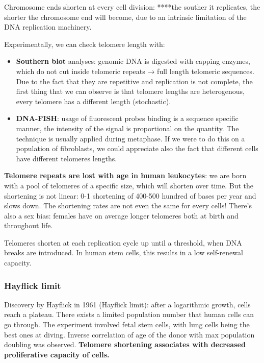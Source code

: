Chromosome ends shorten at every cell division: ****the souther it
replicates, the shorter the chromosome end will become, due to an
intrinsic limitation of the DNA replication machinery.

Experimentally, we can check telomere length with:

\begin{itemize}
\tightlist
\item
  \textbf{Southern blot} analyses: genomic DNA is digested with capping
  enzymes, which do not cut inside telomeric repeats → full length
  telomeric sequences. Due to the fact that they are repetitive and
  replication is not complete, the first thing that we can observe is
  that telomere lengths are heterogenous, every telomere has a different
  length (stochastic).
\item
  \textbf{DNA-FISH}: usage of fluorescent probes binding is a sequence
  specific manner, the intensity of the signal is proportional on the
  quantity. The technique is usually applied during metaphase. If we
  were to do this on a population of fibroblasts, we could appreciate
  also the fact that different cells have different telomeres lengths.
\end{itemize}

\textbf{Telomere repeats are lost with age in human leukocytes}: we are
born with a pool of telomeres of a specific size, which will shorten
over time. But the shortening is not linear: 0-1 shortening of 400-500
hundred of bases per year and slows down. The shortening rates are not
even the same for every cells! There's also a sex bias: females have on
average longer telomeres both at birth and throughout life.

Telomeres shorten at each replication cycle up until a threshold, when
DNA breaks are introduced. In human stem cells, this results in a low
self-renewal capacity.

\hypertarget{hayflick-limit}{%
\subsubsection{Hayflick limit}\label{hayflick-limit}}

Discovery by Hayflick in 1961 (Hayflick limit): after a logarithmic
growth, cells reach a plateau. There exists a limited population number
that human cells can go through. The experiment involved fetal stem
cells, with lung cells being the best ones at diving. Inverse
correlation of age of the donor with max population doubling was
observed. \textbf{Telomere shortening associates with decreased
proliferative capacity of cells.}

